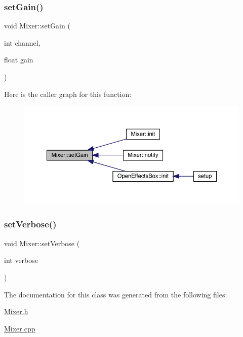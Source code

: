 \subsubsection{\texorpdfstring{set\+Gain()}{setGain()}}
{\footnotesize\ttfamily void Mixer\+::set\+Gain (\begin{DoxyParamCaption}\item[{int}]{channel,  }\item[{float}]{gain }\end{DoxyParamCaption})}

Here is the caller graph for this function\+:\nopagebreak
\begin{figure}[H]
\begin{center}
\leavevmode
\includegraphics[width=350pt]{class_mixer_ab8ff46ce57c3c783de4cefbb6f86b1cc_icgraph}
\end{center}
\end{figure}
\mbox{\label{class_mixer_ae6922f1a38efc4a5f7bee94841248086}} 
\subsubsection{\texorpdfstring{set\+Verbose()}{setVerbose()}}
{\footnotesize\ttfamily void Mixer\+::set\+Verbose (\begin{DoxyParamCaption}\item[{int}]{verbose }\end{DoxyParamCaption})}



The documentation for this class was generated from the following files\+:\begin{DoxyCompactItemize}
\item 
\mbox{\hyperlink{_mixer_8h}{Mixer.\+h}}\item 
\mbox{\hyperlink{_mixer_8cpp}{Mixer.\+cpp}}\end{DoxyCompactItemize}
